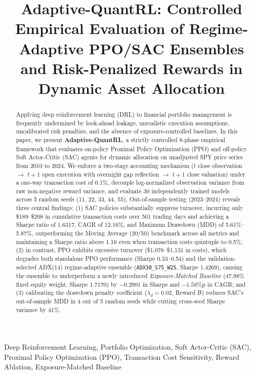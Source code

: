 \documentclass[10pt,twocolumn,conference]{IEEEtran}
\title{Adaptive-QuantRL: Controlled Empirical Evaluation of Regime-Adaptive PPO/SAC Ensembles and Risk-Penalized Rewards in Dynamic Asset Allocation}
\author{
\IEEEauthorblockN{Hansu Lee}
\IEEEauthorblockA{Quantitative Finance \& Reinforcement Learning Research\\
Email: ihansu@research.quantrl.org}
}
\begin{document}
\maketitle

\begin{abstract}
Applying deep reinforcement learning (DRL) to financial portfolio management is frequently undermined by look-ahead leakage, unrealistic execution assumptions, uncalibrated risk penalties, and the absence of exposure-controlled baselines. In this paper, we present \textbf{Adaptive-QuantRL}, a strictly controlled 8-phase empirical framework that evaluates on-policy Proximal Policy Optimization (PPO) and off-policy Soft Actor-Critic (SAC) agents for dynamic allocation on unadjusted SPY price series from 2010 to 2024. We enforce a two-stage accounting mechanism ($t$ close observation $\rightarrow$ $t+1$ open execution with overnight gap reflection $\rightarrow$ $t+1$ close valuation) under a one-way transaction cost of 0.1\%, decouple log-normalized observation variance from raw non-negative reward variance, and evaluate 30 independently trained models across 5 random seeds (11, 22, 33, 44, 55). Out-of-sample testing (2023--2024) reveals three central findings: (1) SAC policies substantially suppress turnover, incurring only \$189--\$208 in cumulative transaction costs over 501 trading days and achieving a Sharpe ratio of 1.6317, CAGR of 12.16\%, and Maximum Drawdown (MDD) of 5.61\%--5.87\%, outperforming the Moving Average (20/50) benchmark across all metrics and maintaining a Sharpe ratio above 1.16 even when transaction costs quintuple to 0.5\%; (2) in contrast, PPO exhibits excessive turnover (\$1,078--\$1,131 in costs), which degrades both standalone PPO performance (Sharpe 0.33--0.54) and the validation-selected ADX(14) regime-adaptive ensemble (\texttt{ADX30\_S75\_W25}, Sharpe 1.4269), causing the ensemble to underperform a newly introduced \emph{Exposure-Matched Baseline} (47.98\% fixed equity weight, Sharpe 1.7170) by $-0.2901$ in Sharpe and $-1.58\%$p in CAGR; and (3) calibrating the drawdown penalty coefficient ($\lambda_d = 0.02$, Reward B) reduces SAC's out-of-sample MDD in 4 out of 5 random seeds while cutting cross-seed Sharpe variance by 41\%.
\end{abstract}

\begin{IEEEkeywords}
Deep Reinforcement Learning, Portfolio Optimization, Soft Actor-Critic (SAC), Proximal Policy Optimization (PPO), Transaction Cost Sensitivity, Reward Ablation, Exposure-Matched Baseline
\end{IEEEkeywords}
\end{document}
